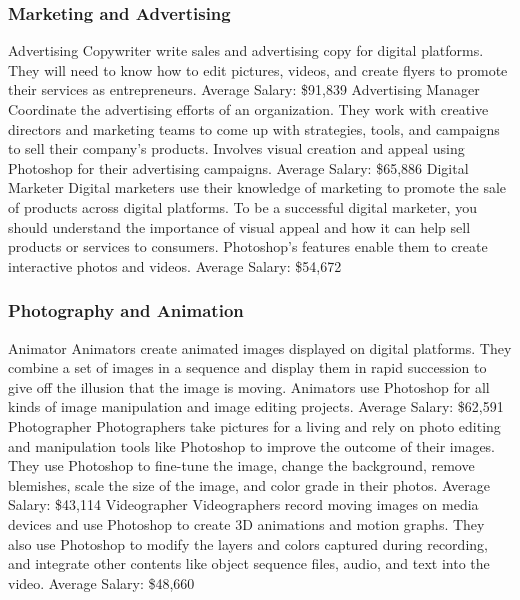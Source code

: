 \documentclass{beamer}
\begin{document}
	\begin{frame}
	\frametitle{Marketing and Advertising}
	\begin{outline}
		\1 Advertising Copywriter
		\2 write sales and advertising copy for digital platforms. They will need to know how to edit pictures, videos, and create flyers to promote their services as entrepreneurs. 
		\2 Average Salary:  \$91,839
		\1 Advertising Manager 
		\2 Coordinate the advertising efforts of an organization. They work with creative directors and marketing teams to come up with strategies, tools, and campaigns to sell their company’s products. Involves visual creation and appeal using Photoshop for their advertising campaigns. 
		\2 Average Salary:  \$65,886
		\1 Digital Marketer 
		\2 Digital marketers use their knowledge of marketing to promote the sale of products across digital platforms. To be a successful digital marketer, you should understand the importance of visual appeal and how it can help sell products or services to consumers.  Photoshop’s features enable them to create interactive photos and videos. 
		\2 Average Salary:  \$54,672
	\end{outline}
\end{frame}

	\begin{frame}
	\frametitle{Photography and Animation}
	\begin{outline}
		\1 Animator
		\2 Animators create animated images displayed on digital platforms. They combine a set of images in a sequence and display them in rapid succession to give off the illusion that the image is moving. Animators use Photoshop for all kinds of image manipulation and image editing projects. 
		\2 Average Salary:  \$62,591
		\1 Photographer 
		\2 Photographers take pictures for a living and rely on photo editing and manipulation tools like Photoshop to improve the outcome of their images. They use Photoshop to fine-tune the image, change the background, remove blemishes, scale the size of the image, and color grade in their photos. 
		\2 Average Salary:  \$43,114
		\1 Videographer 
		\2 Videographers record moving images on media devices and use Photoshop to create 3D animations and motion graphs. They also use Photoshop to modify the layers and colors captured during recording, and integrate other contents like object sequence files, audio, and text into the video. 
		\2 Average Salary:  \$48,660
	\end{outline}
\end{frame}
\end{document}
